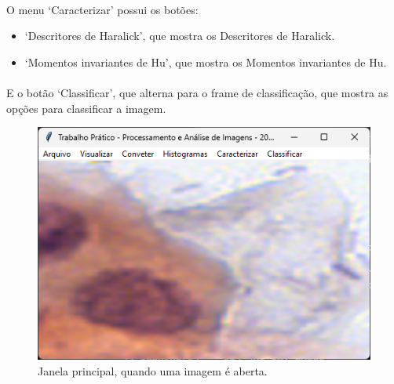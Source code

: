 \documentclass[12pt]{article}
\begin{document}
\paragraph{}O menu ‘Caracterizar’ possui os botões:

\begin{itemize}
    \item ‘Descritores de Haralick’, que mostra os Descritores de Haralick.

    \item ‘Momentos invariantes de Hu’, que mostra os Momentos invariantes de Hu.
\end{itemize}

\paragraph{}E o botão ‘Classificar’, que alterna para o frame de classificação, que mostra as opções para classificar a imagem.

\begin{figure}
    \centering
    \includegraphics{Captura de tela 2024-06-10 094827.png}
    \caption{Janela principal, quando uma imagem é aberta.}
    \label{fig:janela-principal-imagem-aberta}
\end{figure}
\end{document}
